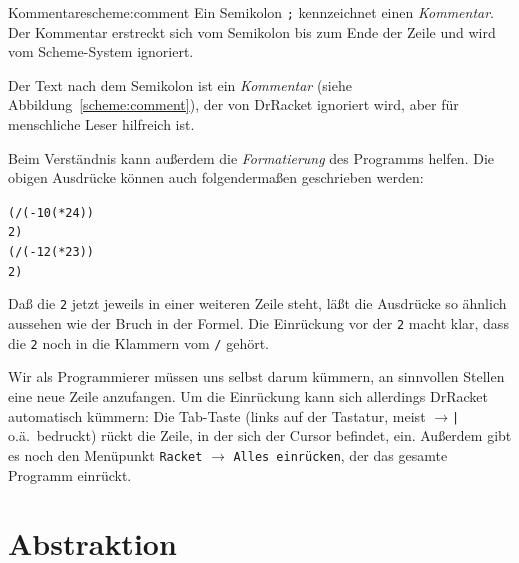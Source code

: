 \begin{feature}{Kommentare}{scheme:comment}
  Ein Semikolon \texttt{;} kennzeichnet einen 
  \textit{Kommentar}.  Der Kommentar erstreckt sich
  vom Semikolon bis zum Ende der Zeile und wird vom Scheme-System
  ignoriert.
\end{feature}
%
Der Text nach dem Semikolon ist ein \textit{Kommentar} (siehe
Abbildung~\ref{scheme:comment}), der von DrRacket ignoriert wird, aber
für menschliche Leser hilfreich ist.

Beim Verständnis kann außerdem die
\textit{Formatierung} des Programms helfen.  Die
obigen Ausdrücke können auch folgendermaßen geschrieben werden:
%
\begin{alltt}
(/ (- 10 (* 2 4))
   2)
(/ (- 12 (* 2 3))
   2)
\end{alltt}
%
Daß die \texttt{2} jetzt jeweils in einer weiteren Zeile steht, läßt
die Ausdrücke so ähnlich aussehen wie der Bruch in der Formel.  Die
Einrückung vor der \texttt{2} macht klar, dass die \texttt{2} noch in
die Klammern vom \texttt{/} gehört.

Wir als Programmierer müssen uns selbst darum kümmern, an sinnvollen
Stellen eine neue Zeile anzufangen.  Um die Einrückung kann sich
allerdings DrRacket automatisch kümmern: Die Tab-Taste (links auf der
Tastatur, meist $\rightarrow$\verb/|/ o.ä.\ bedruckt) rückt die Zeile,
in der sich der Cursor befindet, ein.  Außerdem gibt es noch den
Menüpunkt \texttt{Racket} $\rightarrow$ \texttt{Alles einrücken}, der
das gesamte Programm einrückt.

\section{Abstraktion}

